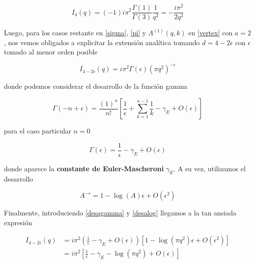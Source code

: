 \documentclass{article}
\numberwithin{equation}{section}
\begin{document}
\begin{boxquation}
\begin{equation}\label{idvertex}
I_4(q)=(-1) i \pi^2 \frac{\Gamma(1)}{\Gamma(3)} \frac{1}{q^2} = -\frac{i \pi^2}{2q^2} 
\end{equation}
\end{boxquation}

Luego, para los casos restante en \ref{sigma}, \ref{pi} y $ \Lambda^{(1)}(q,k) $ en \ref{vertex} con $ a=2 $, nos vemos obligados a explicitar la extensión analítica tomando $ d=4-2\epsilon $ con $ \epsilon $ tomado al menor orden posible

\begin{equation}\label{key}
I_{4-2\epsilon}(q)=i \pi^2 \Gamma(\epsilon ) \left(\pi q^2\right)^{-\epsilon}
\end{equation}

donde podemos considerar el desarrollo de la función gamma

\begin{equation}
\Gamma(-n + \epsilon) = \frac{(1)^n}{n!} \left[ \frac{1}{\epsilon} + \sum_{k=1}^{n-1}\frac{1}{k} - \gamma_E + O(\epsilon)\right]
\end{equation}

para el caso particular $ n=0 $

\begin{equation}\label{desagamma}
\Gamma(\epsilon)= \frac{1}{\epsilon} - \gamma_E + O(\epsilon) 
\end{equation}

donde aparece la \textbf{constante de Euler-Mascheroni} $ \gamma_E $. A su vez, utilizamos el desarrollo 

\begin{equation}\label{desalog}
A^{-\epsilon} = 1 -\log(A) \epsilon  + O(\epsilon^2)
\end{equation}

Finalmente, introduciendo \ref{desagamma} y \ref{desalog} llegamos a la tan ansiada expresión

\begin{boxquation}
\begin{equation}\label{solucion}
\begin{aligned}
I_{4-2\epsilon}(q)&=i \pi^2 \left(\frac{1}{\epsilon} - \gamma_E + O(\epsilon) \right) \left[1 - \log\left(\pi q^2\right) \epsilon + O(\epsilon^2) \right]\\
&=i \pi^2 \left[ \frac{1}{\epsilon} - \gamma_E - \log\left(\pi q^2\right) + O(\epsilon) \right]
\end{aligned}
\end{equation}
\end{boxquation}
\end{document}
